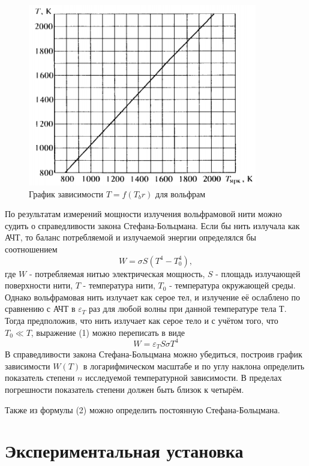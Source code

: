 \documentclass[a4paper, 12pt]{article}%
\begin{document}
\begin{figure}[h]
    \centering
    \includegraphics[width=10cm]{fig2.PNG}
    \caption{График зависимости $T = f(T_br)$ для вольфрам}
    \label{fig:vac}
\end{figure}

По результатам измерений мощности излучения вольфрамовой нити можно судить о справедливости закона Стефана-Больцмана. Если бы нить излучала как АЧТ, то баланс потребляемой и излучаемой энергии определялся бы соотношением 
\begin{equation}
    W = \sigma S (T^4 - T_0^4),
\end{equation}
где $W$ - потребляемая нитью электрическая мощность, $S$ - площадь излучающей поверхности нити, $T$ - температура нити, $T_0$ - температура окружающей среды. Однако вольфрамовая нить излучает как серое тел, и излучение её ослаблено по сравнению с АЧТ в $\varepsilon_T$ раз для любой волны при данной температуре тела Т. Тогда предположив, что нить излучает как серое тело и с учётом того, что $T_0 \ll T$, выражение (1) можно переписать в виде
\begin{equation}
    W = \varepsilon_T S \sigma T^4
\end{equation}
В справедливости закона Стефана-Больцмана можно убедиться, построив график зависимости $W(T)$ в логарифмическом масштабе и по углу наклона определить показатель степени $n$ исследуемой температурной зависимости. В пределах погрешности показатель степени должен быть близок к четырём. \par
Также из формулы (2) можно определить постоянную Стефана-Больцмана.

\section{Экспериментальная установка}
\end{document}
